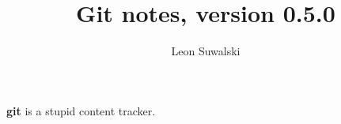 \documentclass{charun}
\title{Git notes, version 0.5.0}
\author{Leon Suwalski}
\begin{document}
\begin{multicols*}{2}
\maketitle
\raggedright

\textbf{git} is a stupid content tracker.








\end{multicols*}
\end{document}

